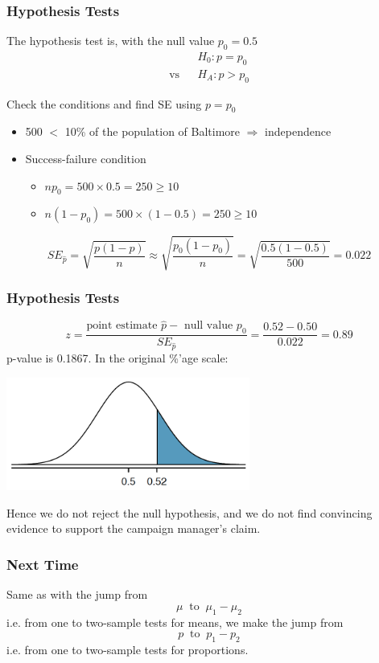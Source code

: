 \documentclass[handout]{beamer}
\newcommand{\blue}[1]{\textcolor{blue2}{#1}}
\newcommand{\phat}{\widehat{p}}
\begin{document}
\begin{frame}[fragile]
\frametitle{Hypothesis Tests}
The hypothesis test is, with the null value $p_0=0.5$
\begin{eqnarray*}
&& H_0: p = p_0\\
\mbox{vs}&& H_A: p > p_0 
\end{eqnarray*}

\pause Check the conditions and find SE \blue{using $p=p_0$}
\begin{itemize}
\pause \item 500 $<$ 10\% of the population of Baltimore $\Rightarrow$ independence
\pause \item Success-failure condition 
\begin{itemize}
\item $np_0 = 500 \times 0.5 = 250 \geq 10$
\item $n(1-p_0) = 500 \times (1-0.5) = 250 \geq 10$
\end{itemize}
\end{itemize}
\pause
\[
SE_{\phat} = \sqrt{\frac{p(1-p)}{n}} \approx \sqrt{\frac{p_0(1-p_0)}{n}} = \sqrt{\frac{0.5(1-0.5)}{500}} = 0.022
\]

\end{frame}


\begin{frame}[fragile]
\frametitle{Hypothesis Tests}
\[
z = \frac{\mbox{point estimate }\phat - \mbox{ null value }p_0}{SE_{\phat}} = \frac{0.52 - 0.50}{0.022} = 0.89
\]
\pause p-value is 0.1867.  In the original \%'age scale:
\begin{center}
   \includegraphics[width=0.6\textwidth]{figure/pvalue.png} 
\end{center}
\pause Hence we do \blue{not} reject the null hypothesis, and we do not find convincing evidence to support the campaign manager's claim.  

\end{frame}


\begin{frame}[fragile]
\addtocounter{framenumber}{2}
\frametitle{Next Time}

Same as with the jump from 
\[\mu \ \mbox{ to } \ \mu_1-\mu_2\] 
i.e. from one to two-sample tests for means, 
we make the jump from 
\[p \ \mbox{ to } \ p_1-p_2\]
i.e. from one to two-sample tests for proportions.
\end{frame}
\end{document}
